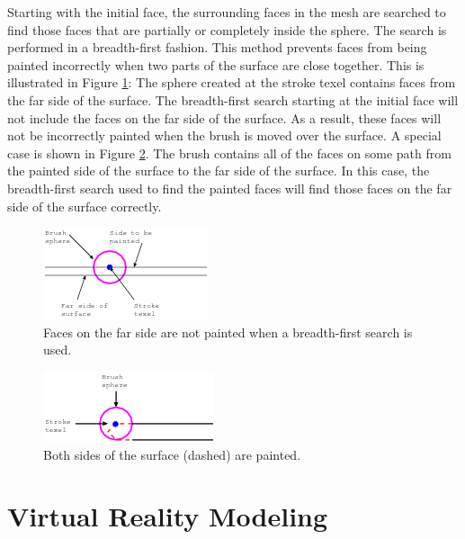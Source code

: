 \documentclass[10pt,twocolumn]{article}
\begin{document}
Starting with the initial face, the surrounding faces in the mesh 
are searched to find those
faces that are partially or completely inside the sphere. 
The search is performed in a breadth-first fashion. 
This method prevents faces from being painted incorrectly when two parts of
the surface are close together.
This is illustrated in Figure \ref{PaintedFacesOne}: 
The sphere created at the stroke
texel contains faces from the far side of the surface. 
The breadth-first search starting at the initial face will not include 
the faces on the far side of the surface.
As a result, these faces will not be incorrectly painted when the brush is moved over the surface.
A special case is shown in Figure \ref{PaintedFacesTwo}.
The brush contains all of the faces on some path from the painted
side of the surface to the far side of the surface.
In this case, the breadth-first search used to find the painted faces
will find those faces on the far side of the surface correctly.

\begin{figure}
\begin{center}
\includegraphics{PaintedFaces.png}
\caption{Faces on the far side are not painted when a breadth-first search is used.}
\label{PaintedFacesOne}
\end{center}
\end{figure}

\begin{figure}
\begin{center}
\includegraphics{BothSidesPainted.png}
\caption{Both sides of the surface (dashed) are painted.}
\label{PaintedFacesTwo}
\end{center}
\end{figure}

\section{Virtual Reality Modeling}
\end{document}
